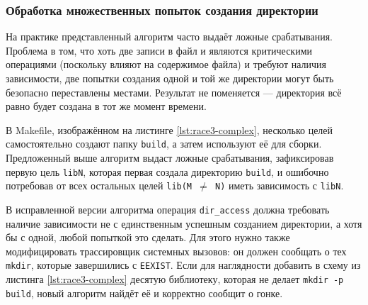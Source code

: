 \subsubsection{Обработка множественных попыток создания директории}

На практике представленный алгоритм часто выдаёт ложные срабатывания. Проблема в том, что хоть две записи в файл и являются критическими операциями (поскольку влияют на содержимое файла) и требуют наличия зависимости, две попытки создания одной и той же директории могут быть безопасно переставлены местами. Результат не поменяется --- директория всё равно будет создана в тот же момент времени.



В Makefile, изображённом на листинге \ref{lst:race3-complex}, несколько целей самостоятельно создают папку \texttt{build}, а затем используют её для сборки. Предложенный выше алгоритм выдаст ложные срабатывания, зафиксировав первую цель \texttt{libN}, которая первая создала директорию \texttt{build}, и ошибочно потребовав от всех остальных целей \texttt{lib(M $\ne$ N)} иметь зависимость с \texttt{libN}.

В исправленной версии алгоритма операция \texttt{dir\_access} должна требовать наличие зависимости не с единственным успешным созданием директории, а хотя бы с одной, любой попыткой это сделать. Для этого нужно также модифицировать трассировщик системных вызовов: он должен сообщать о тех \texttt{mkdir}, которые завершились с \texttt{EEXIST}. Если для наглядности добавить в схему из листинга \ref{lst:race3-complex} десятую библиотеку, которая не делает \texttt{mkdir -p build}, новый алгоритм найдёт её и корректно сообщит о гонке.

